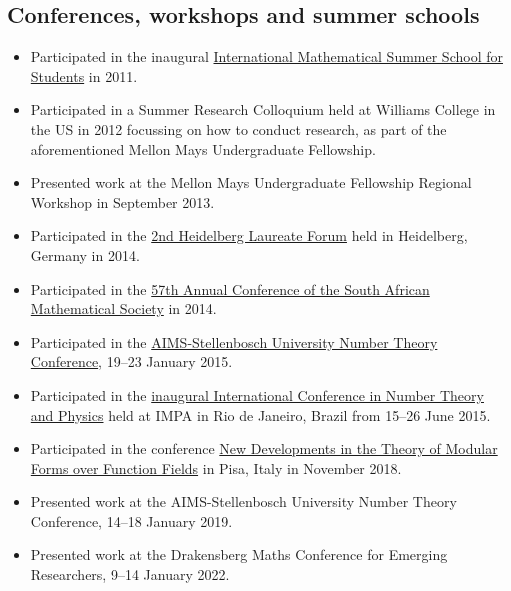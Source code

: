 \documentclass{article}
\begin{document}
\subsection{Conferences, workshops and summer schools}
\begin{itemize}
	\item Participated in the inaugural \href{http://math.jacobs-university.de/summerschool/2011}{International Mathematical Summer School for Students} in 2011.
	\item Participated in a Summer Research Colloquium held at Williams College in the US in 2012 focussing on how to conduct research, as part of the aforementioned Mellon Mays Undergraduate Fellowship.
	\item Presented work at the Mellon Mays Undergraduate Fellowship Regional Workshop in September 2013.
	\item Participated in the \href{http://www.heidelberg-laureate-forum.org/event_2014/}{2nd Heidelberg Laureate Forum} held in Heidelberg, Germany in 2014.
	\item Participated in the \href{http://www.unisa.ac.za/Default.asp?Cmd=ViewContent&ContentID=96795}{57th Annual Conference of the South African Mathematical Society} in 2014.
	\item Participated in the \href{http://www.aims.ac.za/en/research-centre/workshops-conferences/past/aims-stellenbosch-university-number-theory-conference-19-23-january-2015}{AIMS-Stellenbosch University Number Theory Conference}, 19--23 January 2015.
	\item Participated in the \href{http://www.impa.br/opencms/pt/eventos/store/evento_1504}{inaugural International Conference in Number Theory and Physics} held at IMPA in Rio de Janeiro, Brazil from 15--26 June 2015.
	\item Participated in the conference \href{https://dmvpisa2018.wordpress.com/}{New Developments in the Theory of Modular Forms over Function Fields} in Pisa, Italy in November 2018.
	\item Presented work at the AIMS-Stellenbosch University Number Theory Conference, 14--18 January 2019.
	\item Presented work at the Drakensberg Maths Conference for Emerging Researchers, 9--14 January 2022.
\end{itemize}
\end{document}
